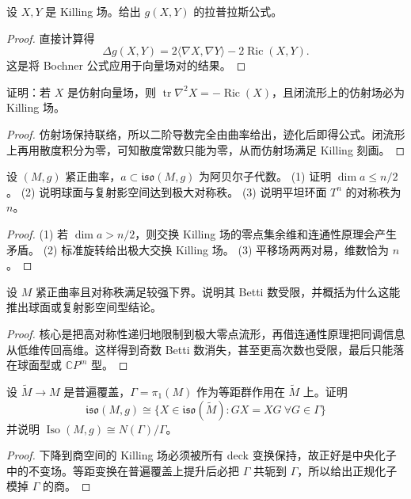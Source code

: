 \documentclass[11pt,a4paper,openany]{ctexbook}
\numberwithin{equation}{chapter}
\begin{document}
\begin{exercise}
设 \(X,Y\) 是 Killing 场。给出 \(g(X,Y)\) 的拉普拉斯公式。
\end{exercise}
\begin{proof}
直接计算得
\[
\Delta g(X,Y)=2\langle\nabla X,\nabla Y\rangle-2\operatorname{Ric}(X,Y).
\]
这是将 Bochner 公式应用于向量场对的结果。
\end{proof}

\begin{exercise}
证明：若 \(X\) 是仿射向量场，则 \(\operatorname{tr}\nabla^2X=-\operatorname{Ric}(X)\)，且闭流形上的仿射场必为 Killing 场。
\end{exercise}
\begin{proof}
仿射场保持联络，所以二阶导数完全由曲率给出，迹化后即得公式。闭流形上再用散度积分为零，可知散度常数只能为零，从而仿射场满足 Killing 刻画。
\end{proof}

\begin{exercise}
设 \((M,g)\) 紧正曲率，\(a\subset\mathfrak{iso}(M,g)\) 为阿贝尔子代数。
(1) 证明 \(\dim a\le n/2\)。
(2) 说明球面与复射影空间达到极大对称秩。
(3) 说明平坦环面 \(T^n\) 的对称秩为 \(n\)。
\end{exercise}
\begin{proof}
(1) 若 \(\dim a>n/2\)，则交换 Killing 场的零点集余维和连通性原理会产生矛盾。  
(2) 标准旋转给出极大交换 Killing 场。  
(3) 平移场两两对易，维数恰为 \(n\)。
\end{proof}

\begin{exercise}
设 \(M\) 紧正曲率且对称秩满足较强下界。说明其 Betti 数受限，并概括为什么这能推出球面或复射影空间型结论。
\end{exercise}
\begin{proof}
核心是把高对称性递归地限制到极大零点流形，再借连通性原理把同调信息从低维传回高维。这样得到奇数 Betti 数消失，甚至更高次数也受限，最后只能落在球面型或 \(\mathbb CP^m\) 型。
\end{proof}

\begin{exercise}
设 \(\widetilde M\to M\) 是普遍覆盖，\(\Gamma=\pi_1(M)\) 作为等距群作用在 \(\widetilde M\) 上。证明
\[
\mathfrak{iso}(M,g)\cong \{X\in\mathfrak{iso}(\widetilde M): GX=XG\ \forall G\in\Gamma\}
\]
并说明 \(\operatorname{Iso}(M,g)\cong N(\Gamma)/\Gamma\)。
\end{exercise}
\begin{proof}
下降到商空间的 Killing 场必须被所有 deck 变换保持，故正好是中央化子中的不变场。等距变换在普遍覆盖上提升后必把 \(\Gamma\) 共轭到 \(\Gamma\)，所以给出正规化子模掉 \(\Gamma\) 的商。
\end{proof}
\end{document}
